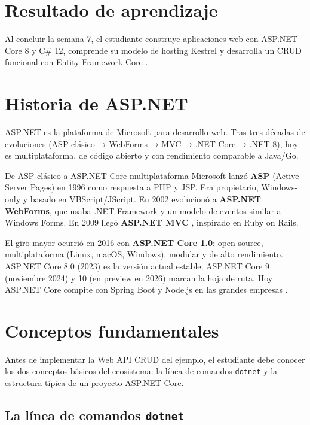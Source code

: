 \documentclass[11pt,a4paper,openany]{book}
\begin{document}
\section*{Resultado de aprendizaje}
Al concluir la semana 7, el estudiante construye aplicaciones web con
ASP.NET Core 8 y C\# 12, comprende su modelo de hosting Kestrel y
desarrolla un CRUD funcional con Entity Framework Core
\cite{lock2021asp,galloway2011mvc}.

\section{Historia de ASP.NET}

ASP.NET es la plataforma de Microsoft para desarrollo web.
Tras tres décadas de evoluciones (ASP clásico → WebForms → MVC →
.NET Core → .NET 8), hoy es multiplataforma, de código abierto y
con rendimiento comparable a Java/Go.


\begin{cajahistoria}{De ASP clásico a ASP.NET Core multiplataforma}
Microsoft lanzó \textbf{ASP} (Active Server Pages) en 1996 como
respuesta a PHP y JSP. Era propietario, Windows-only y basado en
VBScript/JScript. En 2002 evolucionó a \textbf{ASP.NET WebForms},
que usaba .NET Framework y un modelo de eventos similar a Windows
Forms. En 2009 llegó \textbf{ASP.NET MVC} \cite{galloway2011mvc},
inspirado en Ruby on Rails.

El giro mayor ocurrió en 2016 con \textbf{ASP.NET Core 1.0}: open
source, multiplataforma (Linux, macOS, Windows), modular y de alto
rendimiento. ASP.NET Core 8.0 (2023) es la versión actual estable;
ASP.NET Core 9 (noviembre 2024) y 10 (en preview en 2026) marcan la
hoja de ruta. Hoy ASP.NET Core compite con Spring Boot y Node.js en
las grandes empresas \cite{lock2021asp}.
\end{cajahistoria}

\section{Conceptos fundamentales}

Antes de implementar la Web API CRUD del ejemplo, el
estudiante debe conocer los dos conceptos básicos del ecosistema:
la línea de comandos \texttt{dotnet} y la estructura típica de un
proyecto ASP.NET Core.


\subsection{La línea de comandos \texttt{dotnet}}
\end{document}
